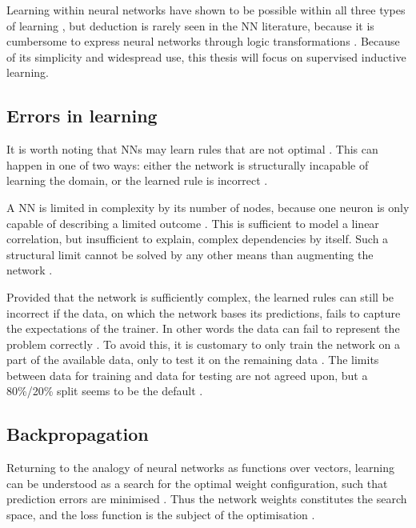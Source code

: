 \documentclass[report.tex]{subfiles}
\begin{document}
Learning within neural networks have shown to be possible within all three
types of learning \cite{Schmidhuber2014, Russel2007}, but deduction is rarely
seen in the \gls{NN} literature, because it is cumbersome to express neural
networks through logic transformations \cite{Pearl2018}.
Because of its simplicity and widespread use, this thesis will focus on supervised
inductive learning.

\subsection{Errors in learning}
It is worth noting that \gls{NN}s may learn 
rules  that are not optimal \cite{Russel2007}.
This can happen in one of two ways: either the
network is structurally incapable of learning the domain, 
or the learned rule is incorrect \cite{Russel2007, Eliasmith2015}.

A \gls{NN} is limited in complexity by its number of nodes,
because one neuron is only capable of describing a limited
outcome \cite{Dayan2001, Russel2007}.
This is sufficient to model a linear correlation, but insufficient
to explain, complex dependencies by itself.
Such a structural limit cannot be solved by any other means
than augmenting the network \cite{Russel2007}.

Provided that the network is sufficiently complex, the 
learned rules can still be incorrect if the data, on which
the network bases its predictions, fails to capture the 
expectations of the trainer.
In other words the data can fail to represent the problem 
correctly \cite{Russel2007}.
To avoid this, it is customary to only train the network
on a part of the available data, only to test it on 
the remaining data \cite{Russel2007, Schmidhuber2014}.
The limits between data for training and data for testing
are not agreed upon, but a 80\%/20\% split seems to be
the default \cite{Russel2007, Schmidhuber2014}.

\subsection{Backpropagation}
Returning to the analogy of neural networks as functions
over vectors, learning can be understood as a search for
the optimal weight configuration, such that prediction
errors are minimised \cite{Rumelhart1988}.
Thus the network weights constitutes the search space, 
and the loss function 
is the subject of the optimisation \cite{Russel2007}.
\end{document}
